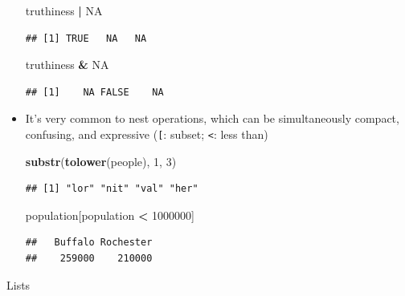 \documentclass[]{article}
\newenvironment{Shaded}{\begin{snugshade}}{\end{snugshade}}
\newcommand{\KeywordTok}[1]{\textcolor[rgb]{0.13,0.29,0.53}{\textbf{#1}}}
\newcommand{\DecValTok}[1]{\textcolor[rgb]{0.00,0.00,0.81}{#1}}
\newcommand{\StringTok}[1]{\textcolor[rgb]{0.31,0.60,0.02}{#1}}
\newcommand{\OtherTok}[1]{\textcolor[rgb]{0.56,0.35,0.01}{#1}}
\newcommand{\OperatorTok}[1]{\textcolor[rgb]{0.81,0.36,0.00}{\textbf{#1}}}
\newcommand{\NormalTok}[1]{#1}
\theoremstyle{definition}
\theoremstyle{definition}
\theoremstyle{remark}
\begin{document}
\begin{itemize}
\begin{Shaded}
\begin{Highlighting}[]
\NormalTok{truthiness }\OperatorTok{|}\StringTok{ }\OtherTok{NA}
\end{Highlighting}
\end{Shaded}

\begin{verbatim}
## [1] TRUE   NA   NA
\end{verbatim}

\begin{Shaded}
\begin{Highlighting}[]
\NormalTok{truthiness }\OperatorTok{&}\StringTok{ }\OtherTok{NA}
\end{Highlighting}
\end{Shaded}

\begin{verbatim}
## [1]    NA FALSE    NA
\end{verbatim}
\item
  It's very common to nest operations, which can be simultaneously
  compact, confusing, and expressive (\texttt{{[}}: subset;
  \texttt{\textless{}}: less than)

\begin{Shaded}
\begin{Highlighting}[]
\KeywordTok{substr}\NormalTok{(}\KeywordTok{tolower}\NormalTok{(people), }\DecValTok{1}\NormalTok{, }\DecValTok{3}\NormalTok{)}
\end{Highlighting}
\end{Shaded}

\begin{verbatim}
## [1] "lor" "nit" "val" "her"
\end{verbatim}

\begin{Shaded}
\begin{Highlighting}[]
\NormalTok{population[population }\OperatorTok{<}\StringTok{ }\DecValTok{1000000}\NormalTok{]}
\end{Highlighting}
\end{Shaded}

\begin{verbatim}
##   Buffalo Rochester 
##    259000    210000
\end{verbatim}
\end{itemize}

Lists
\end{document}
